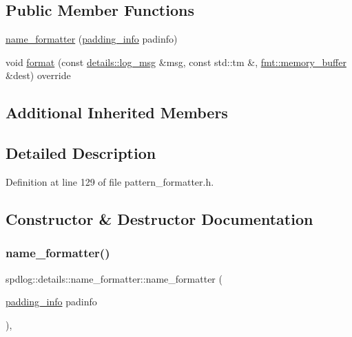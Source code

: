 \subsection*{Public Member Functions}
\begin{DoxyCompactItemize}
\item 
\hyperlink{classspdlog_1_1details_1_1name__formatter_a03bf01931018c5c2cd9dcbff64233d6e}{name\+\_\+formatter} (\hyperlink{structspdlog_1_1details_1_1padding__info}{padding\+\_\+info} padinfo)
\item 
void \hyperlink{classspdlog_1_1details_1_1name__formatter_ac7e2adb4e29b3fbf06ef3c0e236d64de}{format} (const \hyperlink{structspdlog_1_1details_1_1log__msg}{details\+::log\+\_\+msg} \&msg, const std\+::tm \&, \hyperlink{format_8h_a21cbf729f69302f578e6db21c5e9e0d2}{fmt\+::memory\+\_\+buffer} \&dest) override
\end{DoxyCompactItemize}
\subsection*{Additional Inherited Members}


\subsection{Detailed Description}


Definition at line 129 of file pattern\+\_\+formatter.\+h.



\subsection{Constructor \& Destructor Documentation}
\mbox{\label{classspdlog_1_1details_1_1name__formatter_a03bf01931018c5c2cd9dcbff64233d6e}} 
\subsubsection{\texorpdfstring{name\+\_\+formatter()}{name\_formatter()}}
{\footnotesize\ttfamily spdlog\+::details\+::name\+\_\+formatter\+::name\+\_\+formatter (\begin{DoxyParamCaption}\item[{\hyperlink{structspdlog_1_1details_1_1padding__info}{padding\+\_\+info}}]{padinfo }\end{DoxyParamCaption})\hspace{0.3cm}{\ttfamily [inline]}, {\ttfamily [explicit]}}



